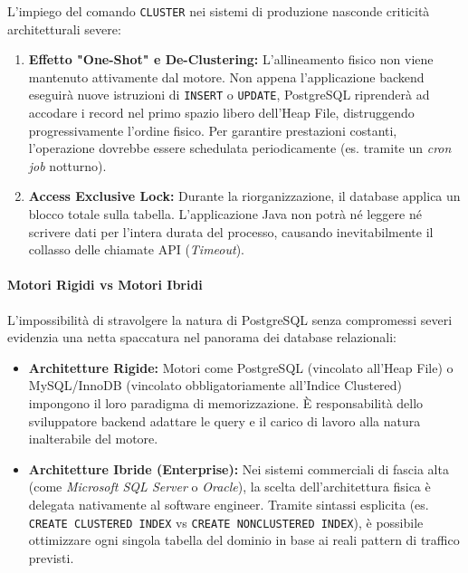 \begin{warningbox}
L'impiego del comando \texttt{CLUSTER} nei sistemi di produzione nasconde criticità architetturali severe:
\begin{enumerate}
    \item \textbf{Effetto "One-Shot" e De-Clustering:} L'allineamento fisico non viene mantenuto attivamente dal motore. Non appena l'applicazione backend eseguirà nuove istruzioni di \texttt{INSERT} o \texttt{UPDATE}, PostgreSQL riprenderà ad accodare i record nel primo spazio libero dell'Heap File, distruggendo progressivamente l'ordine fisico. Per garantire prestazioni costanti, l'operazione dovrebbe essere schedulata periodicamente (es. tramite un \textit{cron job} notturno).
    \item \textbf{Access Exclusive Lock:} Durante la riorganizzazione, il database applica un blocco totale sulla tabella. L'applicazione Java non potrà né leggere né scrivere dati per l'intera durata del processo, causando inevitabilmente il collasso delle chiamate API (\textit{Timeout}).
\end{enumerate}
\end{warningbox}

\paragraph{Motori Rigidi vs Motori Ibridi}
L'impossibilità di stravolgere la natura di PostgreSQL senza compromessi severi evidenzia una netta spaccatura nel panorama dei database relazionali:
\begin{itemize}
    \item \textbf{Architetture Rigide:} Motori come PostgreSQL (vincolato all'Heap File) o MySQL/InnoDB (vincolato obbligatoriamente all'Indice Clustered) impongono il loro paradigma di memorizzazione. È responsabilità dello sviluppatore backend adattare le query e il carico di lavoro alla natura inalterabile del motore.
    \item \textbf{Architetture Ibride (Enterprise):} Nei sistemi commerciali di fascia alta (come \textit{Microsoft SQL Server} o \textit{Oracle}), la scelta dell'architettura fisica è delegata nativamente al software engineer. Tramite sintassi esplicita (es. \texttt{CREATE CLUSTERED INDEX} vs \texttt{CREATE NONCLUSTERED INDEX}), è possibile ottimizzare ogni singola tabella del dominio in base ai reali pattern di traffico previsti.
\end{itemize}

